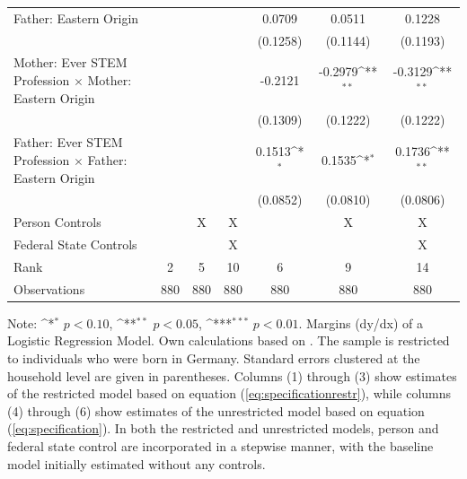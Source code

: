 \documentclass[a4paper, oneside, hyperfootnotes = false]{article}
\def\sym#1{\ifmmode^{#1}\else\(^{#1}\)\fi}
\begin{document}
{\begin{landscape}
\begin{table}[ht]
\begin{center}
{\begin{tabular}{l*{6}{c}}
					\addlinespace
					Father: Eastern Origin&                     &                     &                     &      0.0709         &      0.0511         &      0.1228         \\
					&                     &                     &                     &    (0.1258)         &    (0.1144)         &    (0.1193)         \\
					\addlinespace
					Mother: Ever STEM Profession $\times$ Mother: Eastern Origin&                     &                     &                     &     -0.2121         &     -0.2979\sym{**} &     -0.3129\sym{**} \\
					&                     &                     &                     &    (0.1309)         &    (0.1222)         &    (0.1222)         \\
					\addlinespace
					Father: Ever STEM Profession $\times$ Father: Eastern Origin&                     &                     &                     &      0.1513\sym{*}  &      0.1535\sym{*}  &      0.1736\sym{**} \\
					&                     &                     &                     &    (0.0852)         &    (0.0810)         &    (0.0806)         \\
					\midrule
					Person Controls & & X  & X & & X & X \\
					Federal State Controls & & & X & & & X \\
					Rank                &      2         &      5         &     10         &      6         &      9         &     14         \\
					Observations                   &    880         &    880         &    880         &    880         &    880         &    880         \\
					\bottomrule
			\end{tabular}}
			
			\vspace{2mm}
			
			\parbox{15cm}{
				\linespread{1}\footnotesize Note: \sym{*} \(p<0.10\), \sym{**} \(p<0.05\), \sym{***} \(p<0.01\). Margins (dy/dx) of a Logistic Regression Model. Own calculations based on \cite{SOEP2023}. The sample is restricted to individuals who were born in Germany. Standard errors clustered at the household level are given in parentheses. Columns (1) through (3) show estimates of the restricted model based on equation (\ref{eq:specificationrestr}), while columns (4) through (6) show estimates of the unrestricted model based on equation (\ref{eq:specification}). In both the restricted and unrestricted models, person and federal state control are incorporated in a stepwise manner, with the baseline model initially estimated without any controls.}
			

\end{center}
\end{table}
\end{landscape}}
\end{document}
